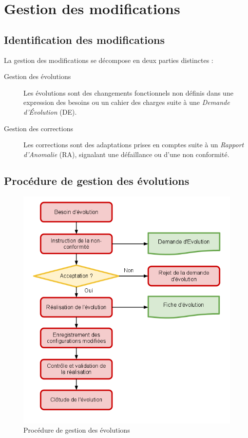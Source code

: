 \documentclass{mise_en_page}
\begin{document}
\section{Gestion des modifications}

\subsection{Identification des modifications}

La gestion des modifications se décompose en deux parties distinctes :

\begin{description}
	\item[Gestion des évolutions]
		Les évolutions sont des changements fonctionnels non définis dans une expression des besoins ou un cahier des charges suite à une \emph{Demande d'Évolution} (DE).
	\item[Gestion des corrections]
		Les corrections sont des adaptations prises en comptes suite à un \emph{Rapport d'Anomalie} (RA), signalant une défaillance ou d'une non conformité.
\end{description}

\subsection{Procédure de gestion des évolutions}

\begin{figure}[H]
	\centering
	\includegraphics[width=150mm]{evol.png}
	\caption{\label{evol} Procédure de gestion des évolutions}
\end{figure}
\end{document}
